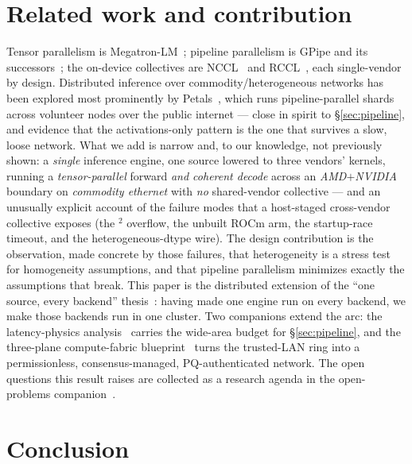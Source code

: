 \documentclass[11pt]{article}
\begin{document}
\section{Related work and contribution}
\label{sec:related}

Tensor parallelism is Megatron-LM~\cite{megatron}; pipeline parallelism is GPipe and its
successors~\cite{gpipe}; the on-device collectives are NCCL~\cite{nccl} and RCCL~\cite{rccl}, each
single-vendor by design. Distributed inference over commodity/heterogeneous networks has been explored
most prominently by Petals~\cite{petals}, which runs pipeline-parallel shards across volunteer nodes over
the public internet --- close in spirit to \S\ref{sec:pipeline}, and evidence that the activations-only
pattern is the one that survives a slow, loose network. What we add is narrow and, to our knowledge, not
previously shown: a \emph{single} inference engine, one source lowered to three vendors' kernels, running
a \emph{tensor-parallel} forward \emph{and coherent decode} across an \emph{AMD$+$NVIDIA} boundary on
\emph{commodity ethernet} with \emph{no} shared-vendor collective --- and an unusually explicit account of
the failure modes that a host-staged cross-vendor collective exposes (the $^2$ overflow, the
unbuilt ROCm arm, the startup-race timeout, and the heterogeneous-dtype wire). The design contribution is
the observation, made concrete by those failures, that heterogeneity is a stress test for homogeneity
assumptions, and that pipeline parallelism minimizes exactly the assumptions that break. This paper is the
distributed extension of the ``one source, every backend'' thesis~\cite{backend,umbrella}: having made one
engine run on every backend, we make those backends run in one cluster. Two companions extend the arc: the
latency-physics analysis~\cite{latency} carries the wide-area budget for \S\ref{sec:pipeline}, and the
three-plane compute-fabric blueprint~\cite{consensus} turns the trusted-LAN ring into a permissionless,
consensus-managed, PQ-authenticated network. The open questions this result raises are collected as a
research agenda in the open-problems companion~\cite{openproblems}.

\section{Conclusion}
\label{sec:conclusion}
\end{document}

